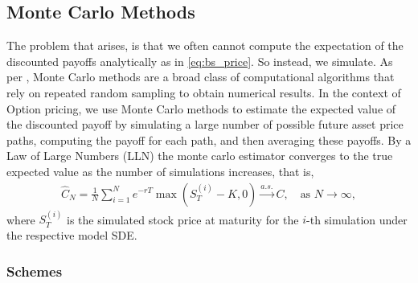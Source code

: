 \subsection{Monte Carlo Methods}

The problem that arises, is that we often cannot compute the expectation of the discounted payoffs analytically as in \eqref{eq:bs_price}. So instead, we simulate. As per \textcite{glassermanMonteCarloMethods2003}, Monte Carlo methods are a broad class of computational algorithms that rely on repeated random sampling to obtain numerical results. In the context of Option pricing, we use Monte Carlo methods to estimate the expected value of the discounted payoff by simulating a large number of possible future asset price paths, computing the payoff for each path, and then averaging these payoffs. By a Law of Large Numbers (LLN) the monte carlo estimator converges to the true expected value as the number of simulations increases, that is, 
\begin{align}
    \hat{C}_N = \frac{1}{N} \sum_{i=1}^{N} e^{-rT} \max(S_T^{(i)} - K, 0) \xrightarrow{a.s.} C, \quad \text{as } N \to \infty,
\end{align}
where $S_T^{(i)}$ is the simulated stock price at maturity for the $i$-th simulation under the respective model SDE.


\subsubsection{Schemes}


